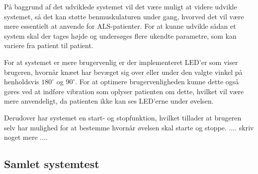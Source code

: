 På baggrund af det udviklede systemet vil det være muligt at videre udvikle systemet, så det kan støtte benmuskulaturen under gang, hvorved det vil være mere essentielt at anvende for ALS-patienter. For at kunne udvikle sådan et system skal der tages højde og undersøges flere ukendte parametre, som kan variere fra patient til patient. 

For at systemet er mere brugervenlig er der implementeret LED'er som viser brugeren, hvornår knæet har bevæget sig over eller under den valgte vinkel på henholdsvis $180^{\circ}$ og $90^{\circ}$. For at optimere brugervenligheden kunne dette også gøres ved at indføre vibration som oplyser patienten om dette, hvilket vil være mere anvendeligt, da patienten ikke kan ses LED'erne under øvelsen.

Derudover har systemet en start- og stopfunktion, hvilket tillader at brugeren selv har mulighed for at bestemme hvornår øvelsen skal starte og stoppe. .... skriv noget mere ....


\subsection{Samlet systemtest}